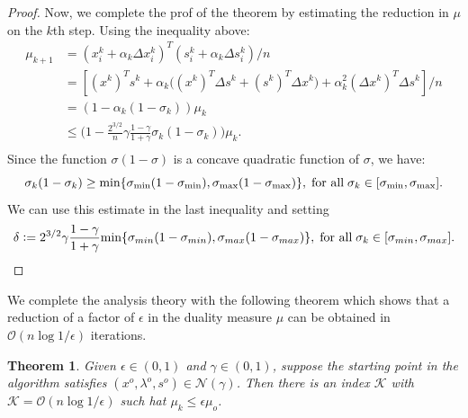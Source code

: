 \documentclass[a4paper,10 pt,titlepage,twoside]{book}
\theoremstyle{plain}
\newtheorem{thm}{Theorem}[chapter]
\theoremstyle{definition}
\theoremstyle{remark}
\begin{document}
\begin{proof}
Now, we complete the prof of the theorem by estimating the reduction in $\mu$ on the $k$th step. Using the inequality above:
\begin{align*}
\mu_{k+1}& = (x_{i}^{k} + \alpha_{k}\Delta x_{i}^{k})^{T}(s_{i}^{k} + \alpha_{k}\Delta s_{i}^{k})/n\\
		 & = [(x^{k})^{T}s^{k} + \alpha_{k}\big((x^{k})^{T}\Delta s^{k} + (s^{k})^{T}\Delta x^{k}\big) +\alpha^{2}_{k}(\Delta x^{k})^{T}\Delta s^{k}]/n\\
		 & = (1 - \alpha_{k}(1-\sigma_{k}))\mu_{k}\\
		 & \leq \Big(1 - \frac{2^{3/2}}{n}\gamma\frac{1-\gamma}{1+\gamma}\sigma_{k}(1-\sigma_{k})\Big)\mu_{k}.\\
\end{align*}
Since the function $\sigma(1 - \sigma)$ is a concave quadratic function of $\sigma$, we have:
\begin{equation*}
\sigma_{k}(1-\sigma_{k})\geq \text{min}\{\sigma_{\text{min}}(1-\sigma_{\text{min}}),\sigma_{\text{max}}(1-\sigma_{\text{max}})\}, \text{\;for all\;}\sigma_{k}\in[\sigma_{\text{min}},\sigma_{\text{max}}].
\end{equation*}
We can use this estimate in the last inequality and setting
\begin{equation*}
\delta \vcentcolon=2^{3/2}\gamma\frac{1-\gamma}{1+\gamma}\text{min}\{\sigma_{min}(1-\sigma_{min}),\sigma_{max}(1-\sigma_{max})\}, \text{\;for all\;}\sigma_{k}\in[\sigma_{min},\sigma_{max}].
\end{equation*}
\end{proof}
We complete the analysis theory with the following theorem which shows that a reduction of a factor of $\epsilon$ in the duality measure $\mu$ can be obtained in $\mathcal{O}(n\log{1/\epsilon})$ iterations.
\begin{thm}
	Given $\epsilon\in(0,1)$ and $\gamma\in(0,1)$, suppose the starting point in the algorithm satisfies $(x^{o},\lambda^{o},s^{o})\in\mathcal{N}(\gamma)$. Then there is an index $\mathcal{K}$ with $\mathcal{K}=\mathcal{O}(n\log1/\epsilon)$ such hat $\mu_{k}\leq\epsilon\mu_{o}$.
\end{thm}
\end{document}
